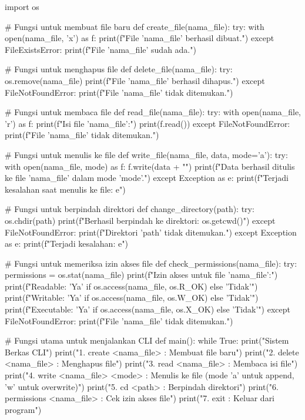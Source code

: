 \documentclass[12pt]{article}
\begin{document}
\begin{python}
import os

# Fungsi untuk membuat file baru
def create_file(nama_file):
    try:
        with open(nama_file, 'x') as f:
            print(f"File '{nama_file}' berhasil dibuat.")
    except FileExistsError:
        print(f"File '{nama_file}' sudah ada.")

# Fungsi untuk menghapus file
def delete_file(nama_file):
    try:
        os.remove(nama_file)
        print(f"File '{nama_file}' berhasil dihapus.")
    except FileNotFoundError:
        print(f"File '{nama_file}' tidak ditemukan.")

# Fungsi untuk membaca file
def read_file(nama_file):
    try:
        with open(nama_file, 'r') as f:
            print(f"Isi file '{nama_file}':")
            print(f.read())
    except FileNotFoundError:
        print(f"File '{nama_file}' tidak ditemukan.")

# Fungsi untuk menulis ke file
def write_file(nama_file, data, mode='a'):
    try:
        with open(nama_file, mode) as f:
            f.write(data + "\n")
            print(f"Data berhasil ditulis ke file '{nama_file}' dalam mode '{mode}'.")
    except Exception as e:
        print(f"Terjadi kesalahan saat menulis ke file: {e}")

# Fungsi untuk berpindah direktori
def change_directory(path):
    try:
        os.chdir(path)
        print(f"Berhasil berpindah ke direktori: {os.getcwd()}")
    except FileNotFoundError:
        print(f"Direktori '{path}' tidak ditemukan.")
    except Exception as e:
        print(f"Terjadi kesalahan: {e}")

# Fungsi untuk memeriksa izin akses file
def check_permissions(nama_file):
    try:
        permissions = os.stat(nama_file)
        print(f"Izin akses untuk file '{nama_file}':")
        print(f"Readable: {'Ya' if os.access(nama_file, os.R_OK) else 'Tidak'}")
        print(f"Writable: {'Ya' if os.access(nama_file, os.W_OK) else 'Tidak'}")
        print(f"Executable: {'Ya' if os.access(nama_file, os.X_OK) else 'Tidak'}")
    except FileNotFoundError:
        print(f"File '{nama_file}' tidak ditemukan.")

# Fungsi utama untuk menjalankan CLI
def main():
    while True:
        print("\nAkses Sistem Berkas CLI")
        print("1. create <nama_file> : Membuat file baru")
        print("2. delete <nama_file> : Menghapus file")
        print("3. read <nama_file>   : Membaca isi file")
        print("4. write <nama_file> <mode> : Menulis ke file (mode 'a' untuk append, 'w' untuk overwrite)")
        print("5. cd <path>          : Berpindah direktori")
        print("6. permissions <nama_file> : Cek izin akses file")
        print("7. exit               : Keluar dari program")


\end{python}
\end{document}
